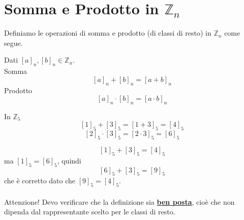 \documentclass[a4paper,12pt, oneside]{book}
\begin{document}
	\section{Somma e Prodotto in $\mathbb{Z}_n$}
		Definiamo le operazioni di somma e prodotto (di classi di resto) in $\mathbb{Z}_n$ come segue.
		\begin{definizione}
			Dati $[a]_n, [b]_n \in \mathbb{Z}_n$.\\
			Somma $$[a]_n + [b]_n = [a+b]_n$$
			Prodotto $$[a]_n \cdot [b]_n = [a \cdot b]_n$$
		\end{definizione}
		\begin{shaded}
			\begin{esempio}
				In $\mathbb{Z}_5$\\
				$$[1]_5 + [3]_5 = [1+3]_5 = [4]_5$$
				$$[2]_5 \cdot [3]_5 = [2 \cdot 3]_5 = [6]_5$$
				\begin{nota}
					$$[1]_5 + [3]_5 = [4]_5$$ ma $[1]_5 = [6]_5$, quindi $$[6]_5 + [3]_5 = [9]_5$$ che è corretto dato che $[9]_5 = [4]_5$.\\\\
					Attenzione! Devo verificare che la definizione sia \underline{\textbf{ben posta}}, cioè che non dipenda dal rappresentante scelto per le classi di resto.
				\end{nota}
			\end{esempio}
		\end{shaded}
\end{document}
